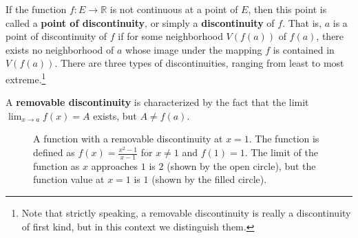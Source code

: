   If the function $f: E \longrightarrow \mathbb{R}$ is not continuous at a point of $E$, then this point is called a \textbf{point of discontinuity}, or simply a \textbf{discontinuity} of $f$. That is, $a$ is a point of discontinuity of $f$ if for some neighborhood $V(f(a))$ of $f(a)$, there exists no neighborhood of $a$ whose image under the mapping $f$ is contained in $V(f(a))$. There are three types of discontinuities, ranging from least to most extreme.\footnote{Note that strictly speaking, a removable discontinuity is really a discontinuity of first kind, but in this context we distinguish them. } 

  \begin{definition}
    A \textbf{removable discontinuity} is characterized by the fact that the limit $\lim_{x \rightarrow a} f(x) = A$ exists, but $A \neq f(a)$. 

    \begin{figure}[H]
      \centering 
      \caption{A function with a removable discontinuity at $x=1$. The function is defined as $f(x) = \frac{x^2 - 1}{x - 1}$ for $x \neq 1$ and $f(1) = 1$. The limit of the function as $x$ approaches $1$ is $2$ (shown by the open circle), but the function value at $x=1$ is $1$ (shown by the filled circle).}
      \label{fig:removable-discontinuity}
    \end{figure}
  \end{definition}


